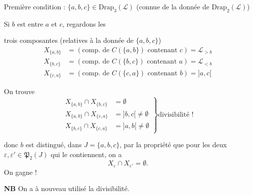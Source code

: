 \documentclass[11pt,a4paper]{article}
\begin{document}
Première condition : $\{a,b,c\} \in \mathrm{Drap}_3(\mathcal{L})$ (connue de la donnée de $\mathrm{Drap}_2(\mathcal{L})$)


Si $b$ est entre $a$ et $c$, regardons les

trois composantes (relatives à la donnée de $\{a,b,c\}$)
\[
  \begin{aligned}
    X_{\{a,b\}} &= (\text{comp. de } C(\{a,b\}) \text{ contenant } c) = \mathcal{L}_{>b} \\
    X_{\{b,c\}} &= (\text{comp. de } C(\{b,c\}) \text{ contenant } a) = \mathcal{L}_{<b} \\
    X_{\{c,a\}} &= (\text{comp. de } C(\{c,a\}) \text{ contenant } b) = ]a, c[
  \end{aligned}
\]

On trouve
\[
  \left.
  \begin{aligned}
    X_{\{a,b\}} \cap X_{\{b,c\}} &= \emptyset \\
    X_{\{a,b\}} \cap X_{\{c,a\}} &= ]b, c[ \neq \emptyset \\
    X_{\{b,c\}} \cap X_{\{c,a\}} &= ]a, b[ \neq \emptyset
  \end{aligned}
  \right\} \text{divisibilité !}
\]

donc $b$ est distingué, dans $J = \{a, b, c\}$, par la propriété que pour les deux   $\varepsilon, \varepsilon' \in \mathfrak{P}_2(J)$ qui le contiennent, on a
\[
  X_{\varepsilon} \cap X_{\varepsilon'} = \emptyset.
\]
On gagne !

\textbf{NB} On a à nouveau utilisé la divisibilité.
\end{document}
